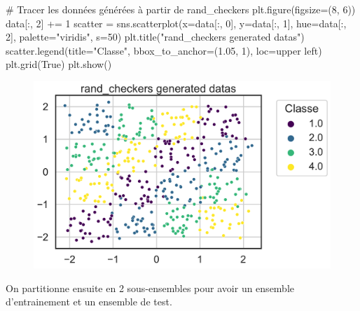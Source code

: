 \documentclass[
  letterpaper,
  DIV=11,
  numbers=noendperiod]{scrartcl}
\newenvironment{Shaded}{\begin{snugshade}}{\end{snugshade}}
\newcommand{\CommentTok}[1]{\textcolor[rgb]{0.37,0.37,0.37}{#1}}
\newcommand{\DecValTok}[1]{\textcolor[rgb]{0.68,0.00,0.00}{#1}}
\newcommand{\FloatTok}[1]{\textcolor[rgb]{0.68,0.00,0.00}{#1}}
\newcommand{\NormalTok}[1]{\textcolor[rgb]{0.00,0.23,0.31}{#1}}
\newcommand{\OperatorTok}[1]{\textcolor[rgb]{0.37,0.37,0.37}{#1}}
\newcommand{\StringTok}[1]{\textcolor[rgb]{0.13,0.47,0.30}{#1}}
\newcommand{\VariableTok}[1]{\textcolor[rgb]{0.07,0.07,0.07}{#1}}
\begin{document}
\begin{Shaded}
\begin{Highlighting}[]
\CommentTok{\# Tracer les données générées à partir de rand\_checkers}
\NormalTok{plt.figure(figsize}\OperatorTok{=}\NormalTok{(}\DecValTok{8}\NormalTok{, }\DecValTok{6}\NormalTok{))}
\NormalTok{data[:, }\DecValTok{2}\NormalTok{] }\OperatorTok{+=} \DecValTok{1}
\NormalTok{scatter }\OperatorTok{=}\NormalTok{ sns.scatterplot(x}\OperatorTok{=}\NormalTok{data[:, }\DecValTok{0}\NormalTok{], y}\OperatorTok{=}\NormalTok{data[:, }\DecValTok{1}\NormalTok{], hue}\OperatorTok{=}\NormalTok{data[:, }\DecValTok{2}\NormalTok{], palette}\OperatorTok{=}\StringTok{"viridis"}\NormalTok{, s}\OperatorTok{=}\DecValTok{50}\NormalTok{)}
\NormalTok{plt.title(}\StringTok{"rand\_checkers generated datas"}\NormalTok{)}
\NormalTok{scatter.legend(title}\OperatorTok{=}\StringTok{"Classe"}\NormalTok{, bbox\_to\_anchor}\OperatorTok{=}\NormalTok{(}\FloatTok{1.05}\NormalTok{, }\DecValTok{1}\NormalTok{), loc}\OperatorTok{=}\StringTok{\textquotesingle{}upper left\textquotesingle{}}\NormalTok{)}
\NormalTok{plt.grid(}\VariableTok{True}\NormalTok{)}
\NormalTok{plt.show()}
\end{Highlighting}
\end{Shaded}

\begin{figure}[H]

{\centering \includegraphics{TP_files/figure-pdf/cell-3-output-1.pdf}

}

\end{figure}

On partitionne ensuite en 2 sous-ensembles pour avoir un ensemble
d'entrainement et un ensemble de test.
\end{document}
